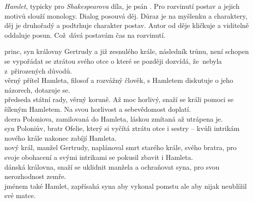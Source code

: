 \documentclass[FGBook.tex]{subfiles}
\begin{document}


\noindent\textit{Hamlet}, typicky pro \textit{Shakespearova} díla, je psán .
Pro rozvinutí postav a jejich motivů slouží monology.
Dialog posouvá děj.
Důraz je na myšlenku a charaktery, děj je druhořadý a podtrhuje charakter postav.
Autor od děje kličkuje a viditelně oddaluje posun.
Což~dává postavám čas na rozvinutí.

\noindent 
{} princ, syn královny Gertrudy a již zesnulého krále,
následník trůnu, není schopen se vypořádat se ztrátou svého otce o které se později dozvídá,
že~nebyla z~přirozených důvodů. \\
 věrný přítel Hamleta, filosof a rozvážný člověk,
s Hamletem diskutuje o jeho názorech, dotazuje se. \\
 předseda státní rady, věrný koruně. Až moc horlivý,
snaží se králi pomoci se šíleným Hamletem. Na svou horlivost a sebevědomost doplatí. \\
 dcera Poloniova, zamilovaná do Hamleta, láskou zmítaná až utrápena je. \\
 syn Poloniův, bratr Ofelie, který si vyčítá ztrátu otce i sestry
-- kvůli intrikám nového krále nakonec zabíjí Hamleta. \\
 nový král, manžel Gertrudy, naplánoval smrt starého krále,
svého bratra, pro svoje obohacení a svými intrikami se pokusil zbavit i Hamleta. \\
 dánská královna, snaží se uklidnit manžela a ochraňovat syna,
pro svou nerozhodnost zemře. \\
 jménem také Hamlet,
zapřísahá syna aby vykonal pomstu ale aby nijak neublížil své matce.
\end{document}
